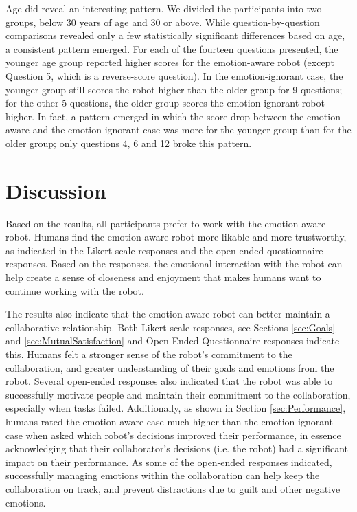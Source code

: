 \documentclass{sig-alternate-05-2015}
\begin{document}
Age did reveal an interesting pattern. We divided the participants into two
groups, below 30 years of age and 30 or above. While question-by-question
comparisons revealed only a few statistically significant differences based on
age, a consistent pattern emerged. For each of the fourteen questions presented,
the younger age group reported higher scores for the emotion-aware robot (except
Question 5, which is a reverse-score question). In the emotion-ignorant case,
the younger group still scores the robot higher than the older group for 9
questions; for the other 5 questions, the older group scores the
emotion-ignorant robot higher. In fact, a pattern emerged in which the score
drop between the emotion-aware and the emotion-ignorant case was more for the
younger group than for the older group; only questions 4, 6 and 12 broke this
pattern.

\section{Discussion}
Based on the results, all participants prefer to work with the emotion-aware
robot. Humans find the emotion-aware robot more likable and more trustworthy, as
indicated in the Likert-scale responses and the open-ended questionnaire
responses. Based on the responses, the emotional interaction with the robot can
help create a sense of closeness and enjoyment that makes humans want to
continue working with the robot.

The results also indicate that the emotion aware robot can better maintain a
collaborative relationship. Both Likert-scale responses, see Sections \ref{sec:Goals}
and \ref{sec:MutualSatisfaction} and Open-Ended Questionnaire responses indicate
this. Humans felt a stronger sense of the robot's commitment to the
collaboration, and greater understanding of their goals and emotions from the
robot. Several open-ended responses also indicated that the robot was able to
successfully motivate people and maintain their commitment to the collaboration,
especially when tasks failed. Additionally, as shown in Section \ref{sec:Performance},
humans rated the emotion-aware case much higher than the emotion-ignorant case
when asked which robot's decisions improved their performance, in essence
acknowledging that their collaborator's decisions (i.e. the robot) had a
significant impact on their performance. As some of the open-ended responses
indicated, successfully managing emotions within the collaboration can help keep
the collaboration on track, and prevent distractions due to guilt and other
negative emotions.
\end{document}
